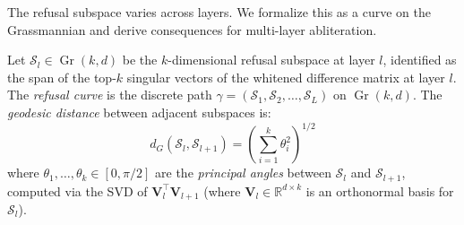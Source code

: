 The refusal subspace varies across layers.
We formalize this as a curve on the Grassmannian and derive consequences for multi-layer abliteration.

\begin{definition}
\label{def:refusal_curve}
Let $\mathcal{S}_l \in \operatorname{Gr}(k, d)$ be the $k$-dimensional refusal subspace at layer $l$, identified as the span of the top-$k$ singular vectors of the whitened difference matrix at layer $l$.
The \emph{refusal curve} is the discrete path $\gamma = (\mathcal{S}_1, \mathcal{S}_2, \ldots, \mathcal{S}_L)$ on $\operatorname{Gr}(k, d)$.
The \emph{geodesic distance} between adjacent subspaces is:
\begin{equation}
    d_G(\mathcal{S}_l, \mathcal{S}_{l+1}) = \left(\sum_{i=1}^k \theta_i^2\right)^{1/2}
\end{equation}
where $\theta_1, \ldots, \theta_k \in [0, \pi/2]$ are the \emph{principal angles} between $\mathcal{S}_l$ and $\mathcal{S}_{l+1}$, computed via the SVD of $\mathbf{V}_l^\top \mathbf{V}_{l+1}$ (where $\mathbf{V}_l \in \mathbb{R}^{d \times k}$ is an orthonormal basis for $\mathcal{S}_l$).
\end{definition}

